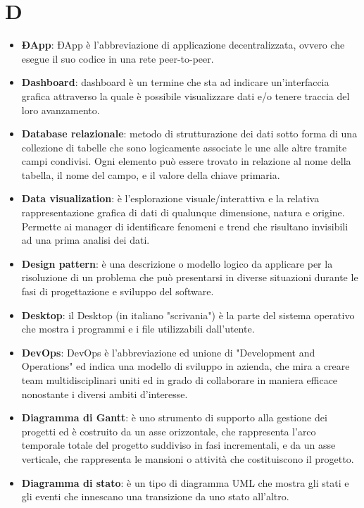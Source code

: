 \documentclass[a4paper, oneside, openany, dvipsnames, table]{article}
\begin{document}
\section{D}
\begin{itemize}
\item \textbf{ÐApp}: ÐApp è l'abbreviazione di applicazione decentralizzata, ovvero che esegue il suo codice in una rete peer-to-peer.
\item \textbf{Dashboard}: dashboard è un termine che sta ad indicare un'interfaccia grafica attraverso la quale è possibile visualizzare dati e/o tenere traccia del loro avanzamento.
\item \textbf{Database relazionale}: metodo di strutturazione dei dati sotto forma di una collezione di tabelle che sono logicamente associate le une alle altre tramite campi condivisi. Ogni elemento può essere trovato in relazione al nome della tabella, il nome del campo, e il valore della chiave primaria.
\item \textbf{Data visualization}: è l'esplorazione visuale/interattiva e la relativa rappresentazione grafica di dati di qualunque dimensione, natura e origine. Permette ai manager di identificare fenomeni e trend che risultano invisibili ad una prima analisi dei dati.
\item \textbf{Design pattern}: è una descrizione o modello logico da applicare per la risoluzione di un problema che può presentarsi in diverse situazioni durante le fasi di progettazione e sviluppo del software.
\item \textbf{Desktop}: il Desktop (in italiano "scrivania") è la parte del sistema operativo che mostra i programmi e i file utilizzabili dall'utente.
\item \textbf{DevOps}: DevOps è l'abbreviazione ed unione di "Development and Operations" ed indica una modello di sviluppo in azienda, che mira a creare team multidisciplinari uniti ed in grado di collaborare in maniera efficace nonostante i diversi ambiti d'interesse.
\item \textbf{Diagramma di Gantt}: è uno strumento di supporto alla gestione dei progetti ed è costruito da un asse orizzontale, che rappresenta l'arco temporale totale del progetto suddiviso in fasi incrementali, e da un asse verticale, che rappresenta le mansioni o attività che costituiscono il progetto.
\item \textbf{Diagramma di stato}: è un tipo di diagramma UML che mostra gli stati e gli eventi che innescano una transizione da uno stato all'altro.
\end{itemize}
\end{document}

